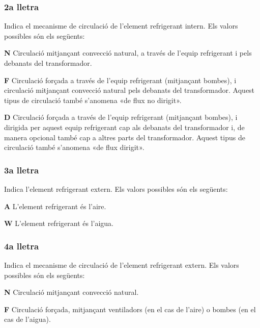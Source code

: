 \subsubsection*{2a lletra}
Indica el mecanisme de circulació de l'element
refrigerant intern. Els valors possibles són els següents:

\begin{list}{}
   {\setlength{\labelwidth}{10mm} \setlength{\leftmargin}{10mm} \setlength{\labelsep}{2mm}}
   \item[\textbf{N}] Circulació mitjançant convecció natural,
    a través de l'equip refrigerant i pels debanats del transformador.
   \item[\textbf{F}] Circulació forçada a través de l'equip refrigerant (mitjançant bombes),
    i circulació mitjançant convecció natural pels debanats del
    transformador. Aquest tipus de circulació també s'anomena «de flux no
    dirigit».
   \item[\textbf{D}] Circulació forçada a través de l'equip refrigerant (mitjançant bombes),
    i dirigida per aquest equip refrigerant cap als debanats del
    transformador i, de manera opcional també cap a altres parts del transformador. Aquest
    tipus de circulació també s'anomena «de flux dirigit».
\end{list}
  

\subsubsection*{3a lletra}
 Indica l'element refrigerant extern. Els valors
possibles són els següents:

\begin{list}{}
   {\setlength{\labelwidth}{10mm} \setlength{\leftmargin}{10mm} \setlength{\labelsep}{2mm}}
   \item[\textbf{A}] L'element refrigerant és l'aire.
   \item[\textbf{W}] L'element refrigerant és l'aigua.
\end{list}
 

\subsubsection*{4a lletra}
 Indica el mecanisme de circulació de l'element
refrigerant extern. Els valors possibles són els següents:
\begin{list}{}
   {\setlength{\labelwidth}{10mm} \setlength{\leftmargin}{10mm} \setlength{\labelsep}{2mm}}
   \item[\textbf{N}] Circulació mitjançant convecció natural.
   \item[\textbf{F}] Circulació forçada, mitjançant ventiladors (en el cas de
   l'aire) o bombes (en el cas de l'aigua).
\end{list}
 

